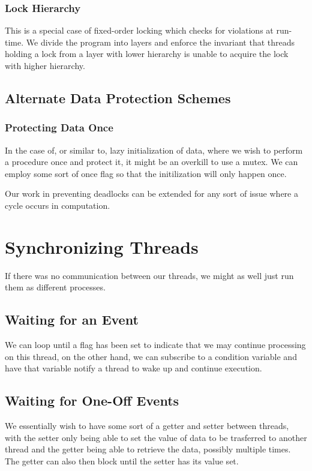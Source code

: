 \documentclass[10pt]{article}
\theoremstyle{break}
\begin{document}
\subsubsection{Lock Hierarchy}
This is a special case of fixed-order locking which checks for violations at run-time.
We divide the program into layers and enforce the invariant that threads holding a lock from a layer with lower hierarchy is unable to acquire the lock with higher hierarchy.

\subsection{Alternate Data Protection Schemes}
\subsubsection{Protecting Data Once}
In the case of, or similar to, lazy initialization of data, where we wish to perform a procedure once and protect it, it might be an overkill to use a mutex.
We can employ some sort of once flag so that the initilization will only happen once.

Our work in preventing deadlocks can be extended for any sort of issue where a cycle occurs in computation.


\newpage
\section{Synchronizing Threads}
If there was no communication between our threads, we might as well just run them as different processes.

\subsection{Waiting for an Event}
We can loop until a flag has been set to indicate that we may continue processing on this thread, on the other hand, we can subscribe to a condition variable and have that variable notify a thread to wake up and continue execution.

\subsection{Waiting for One-Off Events}
We essentially wish to have some sort of a getter and setter between threads, with the setter only being able to set the value of data to be trasferred to another thread and the getter being able to retrieve the data, possibly multiple times.
The getter can also then block until the setter has its value set.
\end{document}
